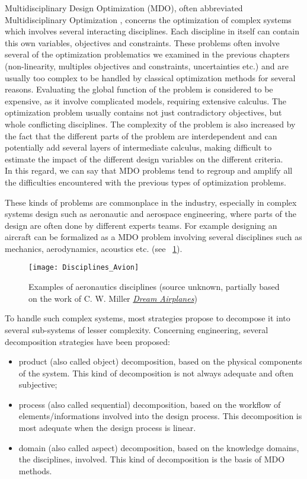 Multidisciplinary Design Optimization (MDO), often abbreviated Multidisciplinary Optimization , concerns the optimization of complex systems which involves several interacting disciplines. Each discipline in itself can contain this own variables, objectives and constraints. These problems often involve several of the optimization problematics we examined in the previous chapters (non-linearity, multiples objectives and constraints, uncertainties etc.) and are usually too complex to be handled by classical optimization methods for several reasons. Evaluating the global function of the problem is considered to be expensive, as it involve complicated models, requiring extensive calculus. The optimization problem usually contains not just contradictory objectives, but whole conflicting disciplines. The complexity of the problem is also increased by the fact that the different parts of the problem are interdependent and can potentially add several layers of intermediate calculus, making difficult to estimate the impact of the different design variables on the different criteria.\\
In this regard, we can say that MDO problems tend to regroup and amplify all the difficulties encountered with the previous types of optimization problems.

These kinds of problems are commonplace in the industry, especially in complex systems design such as aeronautic and aerospace engineering, where parts of the design are often done by different experts teams. For example designing an aircraft can be formalized as a MDO problem involving several disciplines such as mechanics, aerodynamics, acoustics etc. (see \figurename\ \ref{aero-disc}).

\begin{figure}
\centering
\texttt{[image: Disciplines\_Avion]}
\caption{Examples of aeronautics disciplines (source unknown, partially based on the work of C. W. Miller \href{http://thehuwaldtfamily.org/jtrl/research/Airplane\%20Design/Dream\%20Airplane\%20Systems\%20Bias.pdf}{\emph{Dream Airplanes}})}
\label{aero-disc}
\end{figure}

To handle such complex systems, most strategies propose to decompose it into several sub-systems of lesser complexity. Concerning engineering, several decomposition strategies have been proposed\cite{kusiak1995decomposition}:

\begin{itemize}
\item product (also called object) decomposition, based on the physical components of the system. This kind of decomposition is not always adequate and often subjective;
\item process (also called sequential) decomposition, based on the workflow of elements/informations involved into the design process. This decomposition is most adequate when the design process is linear.
\item domain (also called aspect) decomposition, based on the knowledge domains, the disciplines, involved. This kind of decomposition is the basis of MDO methods.
\end{itemize}

